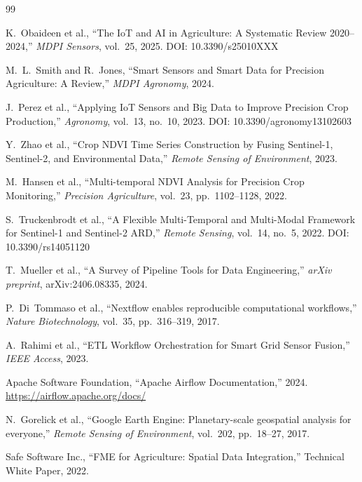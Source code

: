 \documentclass[12pt,a4paper]{article}
\theoremstyle{plain}
\theoremstyle{definition}
\theoremstyle{remark}
\begin{document}
\begin{thebibliography}{99}

K.~Obaideen et al.,
``The IoT and AI in Agriculture: A Systematic Review 2020--2024,''
\textit{MDPI Sensors}, vol.~25, 2025.
DOI: 10.3390/s25010XXX

M.~L.~Smith and R.~Jones,
``Smart Sensors and Smart Data for Precision Agriculture: A Review,''
\textit{MDPI Agronomy}, 2024.

J.~Perez et al.,
``Applying IoT Sensors and Big Data to Improve Precision Crop Production,''
\textit{Agronomy}, vol.~13, no.~10, 2023.
DOI: 10.3390/agronomy13102603

Y.~Zhao et al.,
``Crop NDVI Time Series Construction by Fusing Sentinel-1, Sentinel-2,
and Environmental Data,''
\textit{Remote Sensing of Environment}, 2023.

M.~Hansen et al.,
``Multi-temporal NDVI Analysis for Precision Crop Monitoring,''
\textit{Precision Agriculture}, vol.~23, pp.~1102--1128, 2022.

S.~Truckenbrodt et al.,
``A Flexible Multi-Temporal and Multi-Modal Framework for Sentinel-1
and Sentinel-2 ARD,''
\textit{Remote Sensing}, vol.~14, no.~5, 2022.
DOI: 10.3390/rs14051120

T.~Mueller et al.,
``A Survey of Pipeline Tools for Data Engineering,''
\textit{arXiv preprint}, arXiv:2406.08335, 2024.

P.~Di~Tommaso et al.,
``Nextflow enables reproducible computational workflows,''
\textit{Nature Biotechnology}, vol.~35, pp.~316--319, 2017.

A.~Rahimi et al.,
``ETL Workflow Orchestration for Smart Grid Sensor Fusion,''
\textit{IEEE Access}, 2023.

Apache Software Foundation,
``Apache Airflow Documentation,'' 2024.
\url{https://airflow.apache.org/docs/}

N.~Gorelick et al.,
``Google Earth Engine: Planetary-scale geospatial analysis for everyone,''
\textit{Remote Sensing of Environment}, vol.~202, pp.~18--27, 2017.

Safe Software Inc.,
``FME for Agriculture: Spatial Data Integration,''
Technical White Paper, 2022.


\end{thebibliography}
\end{document}
